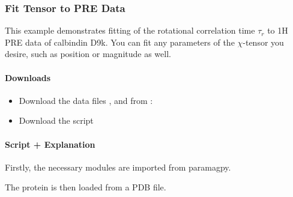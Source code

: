\documentclass[a4paper,10pt,english]{sphinxmanual}
\begin{document}
\subsubsection{Fit Tensor to PRE Data}
\label{\detokenize{examples/pre_fit_proton:fit-tensor-to-pre-data}}\label{\detokenize{examples/pre_fit_proton:pre-fit-proton}}\label{\detokenize{examples/pre_fit_proton::doc}}
This example demonstrates fitting of the rotational correlation time \({\tau_r}\) to 1H PRE data of calbindin D9k. You can fit any parameters of the \({\chi}\)-tensor you desire, such as position or magnitude as well.


\paragraph{Downloads}
\label{\detokenize{examples/pre_fit_proton:downloads}}\begin{itemize}
\item {} 
Download the data files ,  and  from :

\item {} 
Download the script 

\end{itemize}


\paragraph{Script + Explanation}
\label{\detokenize{examples/pre_fit_proton:script-explanation}}
Firstly, the necessary modules are imported from paramagpy.

%
\begin{sphinxVerbatim}[commandchars=\\\{\}]
      
\end{sphinxVerbatim}

The protein is then loaded from a PDB file.

%
\begin{sphinxVerbatim}[commandchars=\\\{\}]
  
\end{sphinxVerbatim}
\end{document}
